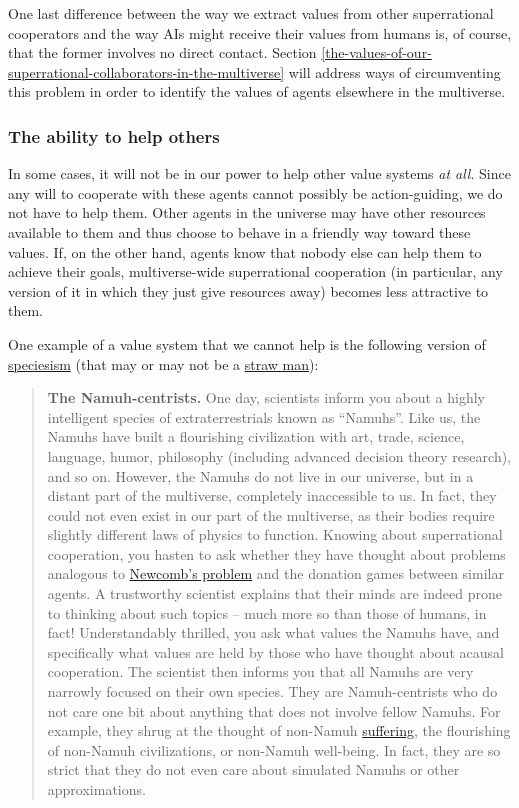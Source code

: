 One last difference between the way we extract values from other
superrational cooperators and the way AIs might receive their values
from humans is, of course, that the former involves no direct contact.
Section \ref{the-values-of-our-superrational-collaborators-in-the-multiverse} will address ways of
circumventing this problem in order to identify the values of agents elsewhere in the multiverse.

\subsubsection{The ability to help
others}\label{the-ability-to-help-others}

In some cases, it will not be in our power to help other value systems
\emph{at all}. Since any will to cooperate with these agents cannot
possibly be action-guiding, we do not have to help them. Other agents in
the universe may have other resources available to them and thus choose
to behave in a friendly way toward these values. If, on the other hand,
agents know that nobody else can help them to achieve their goals,
multiverse-wide superrational cooperation (in particular, any version of
it in which they just give resources away) becomes less attractive to
them.

One example of a value system that we cannot help is the following
version of
\href{https://en.wikipedia.org/wiki/Speciesism}{speciesism} (that
may or may not be a
\href{https://en.wikipedia.org/wiki/Straw_man}{straw man}):

\begin{quote}
\textbf{The Namuh-centrists.} One day, scientists inform you about a
highly intelligent species of extraterrestrials known as ``Namuhs''.
Like us, the Namuhs have built a flourishing civilization with art,
trade, science, language, humor, philosophy (including advanced decision
theory research), and so on. However, the Namuhs do not live in our
universe, but in a distant part of the multiverse, completely
inaccessible to us. In fact, they could not even exist in our part of
the multiverse, as their bodies require slightly different laws of
physics to function. Knowing about superrational cooperation, you hasten
to ask whether they have thought about problems analogous to
\href{https://en.wikipedia.org/wiki/Newcomb\%27s_paradox}{Newcomb's
problem} and the donation games between similar agents. A trustworthy
scientist explains that their minds are indeed prone to thinking about
such topics -- much more so than those of humans, in fact!
Understandably thrilled, you ask what values the Namuhs have, and
specifically what values are held by those who have thought about
acausal cooperation. The scientist then informs you that all Namuhs are
very narrowly focused on their own species. They are Namuh-centrists who
do not care one bit about anything that does not involve fellow Namuhs.
For example, they shrug at the thought of non-Namuh
\href{https://foundational-research.org/the-case-for-suffering-focused-ethics/}{suffering},
the flourishing of non-Namuh civilizations, or non-Namuh well-being. In
fact, they are so strict that they do not even care about simulated
Namuhs or other approximations.
\end{quote}


